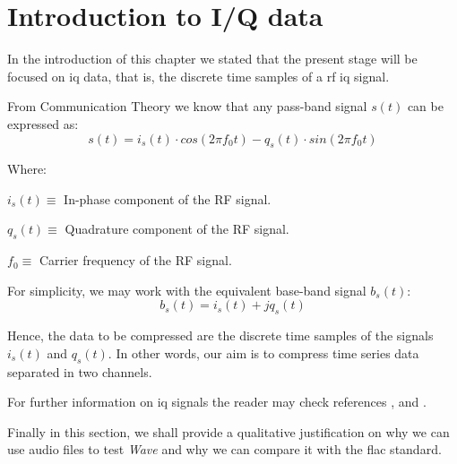\section{Introduction to I/Q data}

In the introduction of this chapter we stated that the present stage will be focused on \acrshort{iq} data, that is, the discrete time samples of a \acrshort{rf} \acrshort{iq} signal.

From Communication Theory we know that any pass-band signal $s(t)$ can be expressed as:
\begin{equation}
s(t) = i_s(t) \cdot cos(2\pi f_0 t) - q_s(t) \cdot sin(2\pi f_0 t)
\end{equation}

Where:
\begin{description}
	\item $i_s(t) \equiv$ In-phase component of the RF signal.
	\item $q_s(t) \equiv$ Quadrature component of the RF signal.
	\item $f_0 \equiv$ Carrier frequency of the RF signal.
\end{description}

For simplicity, we may work with the equivalent base-band signal $b_s(t)$:
\begin{equation}
	b_s(t) = i_s(t) + j q_s(t)
\end{equation}

Hence, the data to be compressed are the discrete time samples of the signals $i_s(t)$ and $q_s(t)$. In other words, our aim is to compress time series data separated in two channels.

For further information on \acrshort{iq} signals the reader may check references \parencite{IQintro}, \parencite{carlson2010communication} and \parencite{ICOM}.

Finally in this section, we shall provide a qualitative justification on why we can use audio files to test \textit{Wave} and why we can compare it with the \acrshort{flac} standard.


